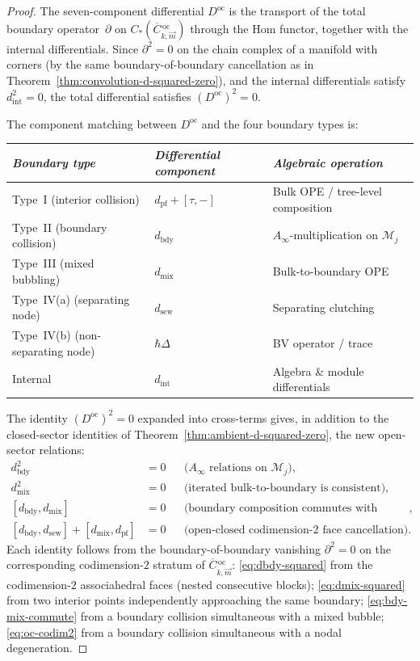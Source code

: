 \begin{proof}
The seven-component differential $D^{\mathrm{oc}}$ is the
transport of the total boundary operator~$\partial$ on
$C_*(\overline{C}{}^{\,\mathrm{oc}}_{k,\vec{m}})$ through
the Hom functor, together with the internal differentials.
Since $\partial^2 = 0$ on the chain complex of a manifold with
corners (by the same boundary-of-boundary cancellation as in
Theorem~\ref{thm:convolution-d-squared-zero}), and the
internal differentials satisfy $d_{\mathrm{int}}^2 = 0$,
the total differential satisfies
$(D^{\mathrm{oc}})^2 = 0$.

The component matching between $D^{\mathrm{oc}}$ and the
four boundary types is:
\begin{center}
\renewcommand{\arraystretch}{1.2}
\begin{tabular}{lll}
\emph{Boundary type} & \emph{Differential component} &
 \emph{Algebraic operation} \\
\hline
Type~I (interior collision)
 & $d_{\mathrm{pf}} + [\tau, -]$
 & Bulk OPE / tree-level composition \\
Type~II (boundary collision)
 & $d_{\mathrm{bdy}}$
 & $A_\infty$-multiplication on $\mathcal{M}_j$ \\
Type~III (mixed bubbling)
 & $d_{\mathrm{mix}}$
 & Bulk-to-boundary OPE \\
Type~IV(a) (separating node)
 & $d_{\mathrm{sew}}$
 & Separating clutching \\
Type~IV(b) (non-separating node)
 & $\hbar\Delta$
 & BV operator / trace \\
Internal
 & $d_{\mathrm{int}}$
 & Algebra \& module differentials
\end{tabular}
\end{center}

The identity $(D^{\mathrm{oc}})^2 = 0$ expanded into
cross-terms gives, in addition to the closed-sector identities of
Theorem~\ref{thm:ambient-d-squared-zero}, the new open-sector
relations:
\begin{align}
d_{\mathrm{bdy}}^2 &= 0
 &&\text{($A_\infty$ relations on $\mathcal{M}_j$)},
 \label{eq:dbdy-squared} \\
d_{\mathrm{mix}}^2 &= 0
 &&\text{(iterated bulk-to-boundary is consistent)},
 \label{eq:dmix-squared} \\
[d_{\mathrm{bdy}}, d_{\mathrm{mix}}] &= 0
 &&\text{(boundary composition commutes with mixed bubbling)},
 \label{eq:bdy-mix-commute} \\
[d_{\mathrm{bdy}}, d_{\mathrm{sew}}]
+ [d_{\mathrm{mix}}, d_{\mathrm{pf}}] &= 0
 &&\text{(open-closed codimension-2 face cancellation)}.
 \label{eq:oc-codim2}
\end{align}
Each identity follows from the boundary-of-boundary vanishing
$\partial^2 = 0$ on the corresponding codimension-$2$ stratum
of $\overline{C}{}^{\,\mathrm{oc}}_{k,\vec{m}}$:
\eqref{eq:dbdy-squared} from the codimension-$2$ associahedral
faces (nested consecutive blocks);
\eqref{eq:dmix-squared} from two interior points independently
approaching the same boundary;
\eqref{eq:bdy-mix-commute} from a boundary collision simultaneous
with a mixed bubble;
\eqref{eq:oc-codim2} from a boundary collision simultaneous with
a nodal degeneration.


\end{proof}
